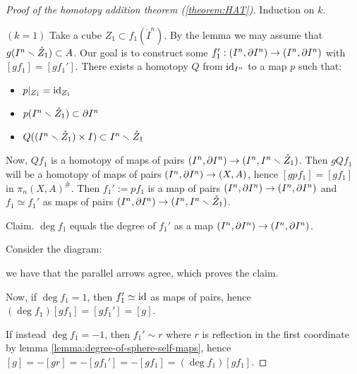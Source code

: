 \begin{proof}[Proof of the homotopy addition theorem (\ref{theorem:HAT})]\renewcommand{\qedsymbol}{\textit{To be continued...}} Induction on $k$.

$(k=1)$ Take a cube $Z_1\subset f_1(\mathring{I}^n)$. By the lemma we may assume that $g(I^n\smallsetminus\mathring{Z}_1)\subset A$. Our goal is to construct some $f_1':(I^n,\partial I^n)\to(I^n,\partial I^n)$ with $[gf_1]=[gf_1']$. There exists\normalmarginpar{} a homotopy $Q$ from $\operatorname{id}_{I^n}$ to a map $p$ such that:
\begin{itemize}
    \item $p|_{Z_1}=\operatorname{id}_{Z_1}$
    \item $p(I^n\smallsetminus\mathring{Z}_1)\subset\partial I^n$
    \item $Q((I^n\smallsetminus\mathring{Z}_1)\times I)\subset I^n\smallsetminus \mathring{Z}_1$
\end{itemize}
Now, $Qf_1$ is a homotopy of maps of pairs $(I^n,\partial I^n)\to(I^n,I^n\smallsetminus\mathring{Z}_1)$. Then $gQf_1$ will be a homotopy of maps of pairs $(I^n,\partial I^n)\to(X,A)$, hence $[gpf_1]=[gf_1]$ in $\pi_n(X,A)^\#$. Then $f_1':= pf_1$ is a map of pairs $(I^n,\partial I^n)\to(I^n,\partial I^n)$ and $f_1\simeq f_1'$ as maps of pairs $(I^n,\partial I^n)\to(I^n,I^n\smallsetminus \mathring{Z}_1)$.

Claim.\reversemarginpar{} $\deg f_1$ equals the degree of $f_1'$ as a map $(I^n,\partial I^n)\to(I^n,\partial I^n)$.

\begin{claimproof}
Consider the diagram:
\begin{center}
\end{center}
we have that the parallel arrows agree, which proves the claim.
\end{claimproof}

Now, if $\deg f_1=1$, then $f_1'\simeq\operatorname{id}$ as maps of pairs, hence $(\deg f_1)[gf_1]=[gf_1']=[g]$.

If instead $\deg f_1=-1$, then $f_1'\sim r$ where $r$ is reflection in the first coordinate by lemma \ref{lemma:degree-of-sphere-self-maps}, hence $[g]=-[gr]=-[gf_1']=-[gf_1]=(\deg f_1)[gf_1]$.

\end{proof}
